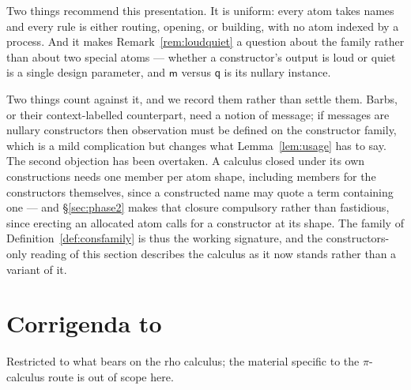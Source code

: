 \documentclass[11pt]{article}
\theoremstyle{plain}
\theoremstyle{definition}
\theoremstyle{remark}
\newcommand{\mm}{\mathsf{m}}
\newcommand{\qq}{\mathsf{q}}
\begin{document}
Two things recommend this presentation. It is uniform: every atom takes names
and every rule is either routing, opening, or building, with no atom indexed
by a process. And it makes Remark~\ref{rem:loudquiet} a question about the
family rather than about two special atoms --- whether a constructor's output
is loud or quiet is a single design parameter, and $\mm$ versus $\qq$ is its
nullary instance.

Two things count against it, and we record them rather than settle them.
Barbs, or their context-labelled counterpart, need a notion of message; if
messages are nullary constructors then observation must be defined on the
constructor family, which is a mild complication but changes what
Lemma~\ref{lem:usage} has to say. The second objection has been overtaken. A calculus closed under its own
constructions needs one member per atom shape, including members for the
constructors themselves, since a constructed name may quote a term containing
one --- and \S\ref{sec:phase2} makes that closure compulsory rather than
fastidious, since erecting an allocated atom calls for a constructor at its
shape. The family of Definition~\ref{def:consfamily} is thus the working
signature, and the constructors-only reading of this section describes the
calculus as it now stands rather than a variant of it.

\section{Corrigenda to \cite{rhocomb}}
\label{sec:corrigenda}

Restricted to what bears on the rho calculus; the material specific to the
$\pi$-calculus route is out of scope here.
\end{document}
